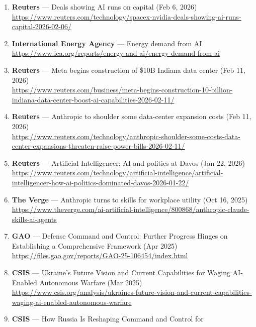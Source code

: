 \documentclass[11pt]{article}
\begin{document}
\begin{enumerate}
  assistants (Feb 6, 2026)\\
  \url{https://www.trendmicro.com/en_us/research/26/b/what-openclaw-reveals-about-agentic-assistants.html}
\item
  \textbf{Reuters} --- Deals showing AI runs on capital (Feb 6, 2026)\\
  \url{https://www.reuters.com/technology/spacex-nvidia-deals-showing-ai-runs-capital-2026-02-06/}
\item
  \textbf{International Energy Agency} --- Energy demand from AI\\
  \url{https://www.iea.org/reports/energy-and-ai/energy-demand-from-ai}
\item
  \textbf{Reuters} --- Meta begins construction of \$10B Indiana data
  center (Feb 11, 2026)\\
  \url{https://www.reuters.com/business/meta-begins-construction-10-billion-indiana-data-center-boost-ai-capabilities-2026-02-11/}
\item
  \textbf{Reuters} --- Anthropic to shoulder some data-center expansion
  costs (Feb 11, 2026)\\
  \url{https://www.reuters.com/technology/anthropic-shoulder-some-costs-data-center-expansions-threaten-raise-power-bills-2026-02-11/}
\item
  \textbf{Reuters} --- Artificial Intelligencer: AI and politics at
  Davos (Jan 22, 2026)\\
  \url{https://www.reuters.com/technology/artificial-intelligence/artificial-intelligencer-how-ai-politics-dominated-davos-2026-01-22/}
\item
  \textbf{The Verge} --- Anthropic turns to skills for workplace utility
  (Oct 16, 2025)\\
  \url{https://www.theverge.com/ai-artificial-intelligence/800868/anthropic-claude-skills-ai-agents}
\item
  \textbf{GAO} --- Defense Command and Control: Further Progress Hinges
  on Establishing a Comprehensive Framework (Apr 2025)\\
  \url{https://files.gao.gov/reports/GAO-25-106454/index.html}
\item
  \textbf{CSIS} --- Ukraine's Future Vision and Current Capabilities for
  Waging AI-Enabled Autonomous Warfare (Mar 2025)\\
  \url{https://www.csis.org/analysis/ukraines-future-vision-and-current-capabilities-waging-ai-enabled-autonomous-warfare}
\item
  \textbf{CSIS} --- How Russia Is Reshaping Command and Control for

\end{enumerate}
\end{document}
